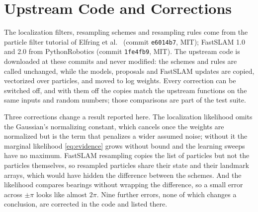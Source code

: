 \section{Upstream Code and Corrections}\label{app:upstream}

The localization filters, resampling schemes and resampling rules come from the particle filter tutorial of
Elfring et al.\ \cite{elfring2021particle} (commit \texttt{e6014b7}, MIT); FastSLAM 1.0 and 2.0 from
PythonRobotics \cite{sakai2018pythonrobotics} (commit \texttt{1fe4fb9}, MIT). The upstream code is downloaded at
these commits and never modified: the schemes and rules are called unchanged, while the models, proposals and
FastSLAM updates are copied, vectorized over particles, and moved to log weights. Every correction can be
switched off, and with them off the copies match the upstream functions on the same inputs and random numbers;
those comparisons are part of the test suite.

Three corrections change a result reported here. The localization likelihood omits the Gaussian's normalizing
constant, which cancels once
the weights are normalized but is the term that penalizes a wider assumed noise; without it the marginal
likelihood \eqref{eq:evidence} grows without bound and the learning sweeps have no maximum.
FastSLAM resampling copies the list of particles but not the particles themselves, so resampled particles share
their state and their landmark arrays, which would have hidden the difference between the schemes. And the
likelihood compares bearings without wrapping the difference, so a small error across $\pm\pi$ looks like almost
$2\pi$. Nine further errors, none of which changes a conclusion, are corrected in the code and listed there.
